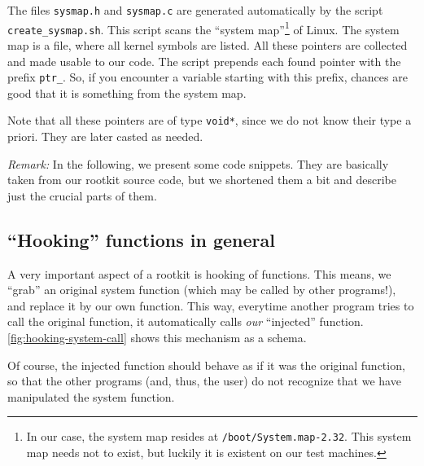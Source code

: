 \documentclass[10pt, letterpaper]{article}
\begin{document}
The files \texttt{sysmap.h} and \texttt{sysmap.c} are generated automatically by the script \linebreak \texttt{create\_sysmap.sh}. This script scans the ``system map''\footnote{In our case, the system map resides at \texttt{/boot/System.map-2.32}. This system map needs not to exist, but luckily it is existent on our test machines.} of Linux. The system map is a file, where all kernel symbols are listed. All these pointers are collected and made usable to our code. The script prepends each found pointer with the prefix \texttt{ptr\_}. So, if you encounter a variable starting with this prefix, chances are good that it is something from the system map.

Note that all these pointers are of type \texttt{void*}, since we do not know their type a priori. They are later casted as needed.

\emph{Remark:} In the following, we present some code snippets. They are basically taken from our rootkit source code, but we shortened them a bit and describe just the crucial parts of them.

\subsection{``Hooking'' functions in general}

A very important aspect of a rootkit is hooking of functions. This means, we ``grab'' an original system function (which may be called by other programs!), and replace it by our own function. This way, everytime another program tries to call the original function, it automatically calls \emph{our} ``injected'' function. \autoref{fig:hooking-system-call} shows this mechanism as a schema.

Of course, the injected function should behave as if it was the original function, so that the other programs (and, thus, the user) do not recognize that we have manipulated the system function.
\end{document}
